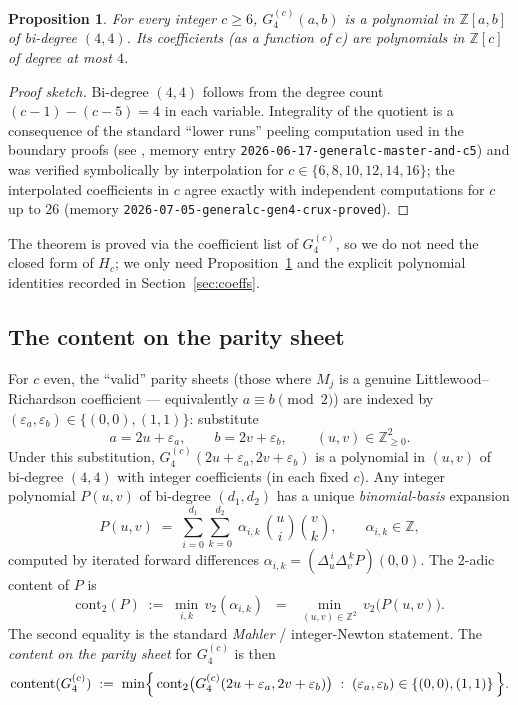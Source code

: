 \documentclass[11pt]{article}
\newtheorem{proposition}[theorem]{Proposition}
\begin{document}
\begin{proposition}\label{prop:biquartic}
For every integer $c \ge 6$, $G_4^{(c)}(a,b)$ is a polynomial in $\mathbb{Z}[a,b]$ of
bi-degree $(4, 4)$. Its coefficients (as a function of $c$) are polynomials in
$\mathbb{Z}[c]$ of degree at most $4$.
\end{proposition}

\begin{proof}[Proof sketch]
Bi-degree $(4,4)$ follows from the degree count $(c-1) - (c-5) = 4$ in each variable.
Integrality of the quotient is a consequence of the standard ``lower runs'' peeling
computation used in the boundary proofs (see \cite{clio2026generalc}, memory entry
\texttt{2026-06-17-generalc-master-and-c5}) and was verified symbolically by
interpolation for $c \in \{6, 8, 10, 12, 14, 16\}$; the interpolated coefficients
in $c$ agree exactly with independent computations for $c$ up to $26$ (memory
\texttt{2026-07-05-generalc-gen4-crux-proved}).
\end{proof}

The theorem is proved via the coefficient list of $G_4^{(c)}$, so we do not need
the closed form of $H_c$; we only need Proposition~\ref{prop:biquartic} and the
explicit polynomial identities recorded in Section~\ref{sec:coeffs}.

\subsection{The content on the parity sheet}\label{ssec:content}

For $c$ even, the ``valid'' parity sheets (those where $M_j$ is a genuine
Littlewood--Richardson coefficient — equivalently $a \equiv b \pmod 2$) are indexed by
$(\varepsilon_a, \varepsilon_b) \in \{(0,0), (1,1)\}$: substitute
\[
  a = 2u + \varepsilon_a, \qquad b = 2v + \varepsilon_b, \qquad (u, v) \in \mathbb{Z}_{\ge 0}^2.
\]
Under this substitution, $G_4^{(c)}(2u+\varepsilon_a, 2v+\varepsilon_b)$ is a polynomial
in $(u, v)$ of bi-degree $(4, 4)$ with integer coefficients (in each fixed $c$).
Any integer polynomial $P(u,v)$ of bi-degree $(d_1, d_2)$ has a unique
\emph{binomial-basis} expansion
\[
  P(u, v) \;=\; \sum_{i=0}^{d_1}\sum_{k=0}^{d_2}\; \alpha_{i,k}\,\binom{u}{i}\binom{v}{k},
  \qquad \alpha_{i,k} \in \mathbb{Z},
\]
computed by iterated forward differences $\alpha_{i,k} = (\Delta_u^{\,i}\Delta_v^{\,k}P)(0,0)$.
The $2$-adic content of $P$ is
\[
  \mathrm{cont}_2(P) \;:=\; \min_{i,k}\, v_2(\alpha_{i,k}) \;\;=\;\; \min_{(u,v)\in\mathbb{Z}^2}\, v_2\bigl(P(u,v)\bigr).
\]
The second equality is the standard \emph{Mahler} / integer-Newton statement.
The \emph{content on the parity sheet} for $G_4^{(c)}$ is then
\[
  \mathrm{content}(G_4^{(c)}) \;:=\; \min\Bigl\{\, \mathrm{cont}_2\bigl(G_4^{(c)}(2u+\varepsilon_a, 2v+\varepsilon_b)\bigr) \;:\; (\varepsilon_a, \varepsilon_b) \in \{(0,0), (1,1)\}\,\Bigr\}.
\]
\end{document}
